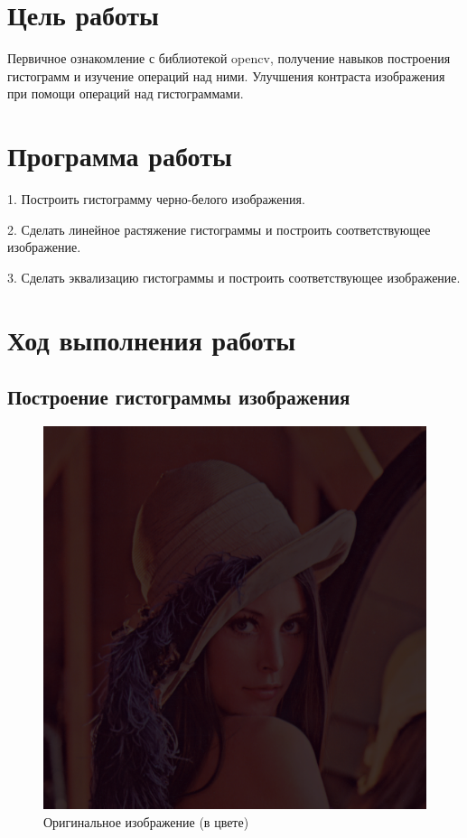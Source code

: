 







\section{Цель работы}
Первичное ознакомление с библиотекой opencv, получение навыков построения гистограмм и изучение операций над ними. Улучшения контраста изображения при помощи операций над гистограммами.


\section{Программа работы}
1. Построить гистограмму черно-белого изображения.

2. Сделать линейное растяжение гистограммы и построить соответствующее изображение. 

3. Сделать эквализацию гистограммы и построить соответствующее изображение.


\section{Ход выполнения работы}

\subsection{Построение гистограммы изображения}

\begin{figure}[H]
	\begin{center}
		\includegraphics[scale=0.7]{Lenna.png}
		\caption{Оригинальное изображение (в цвете)} 
		\label{pic:hist_orig} %
	\end{center}
\end{figure}

